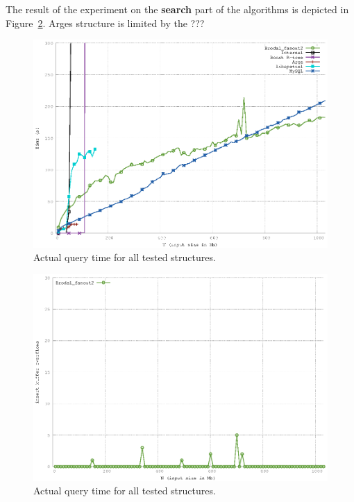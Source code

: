 \documentclass[twoside,11pt,openright]{report}
\begin{document}
The result of the experiment on the \textbf{search} part of the algorithms is depicted in Figure~\ref{fig:result_query_search_complexity}. Arges structure is limited by the ???

\begin{figure}[htp!]
\includegraphics[width=\textwidth]{../src/experiments/query_experiment_results/final2/time_zoom}
\caption{Actual query time for all tested structures.}
\label{fig:result_query_search_complexity}
\end{figure}

\begin{figure}[htp!]
\includegraphics[width=\textwidth]{../src/experiments/query_experiment_results/final2/ibo}
\caption{Actual query time for all tested structures.}
\label{fig:result_query_search_complexity}
\end{figure}
\end{document}
